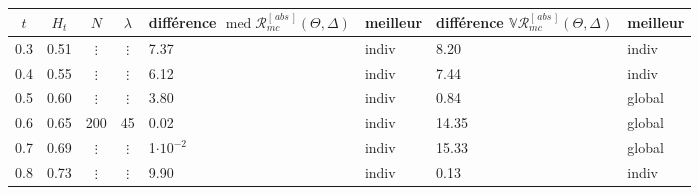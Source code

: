 
\begin{table}[H]
    \begin{tabularx}{\textwidth}{ccccXXXX}
        \toprule
    $t$ & $H_t$ & $N$      & $\lambda$ & différence $\operatorname{med} \mathcal R^{[\,abs\,]}_{mc}(\Theta, \Delta)$ & \textbf{meilleur} & différence  $\mathds V \mathcal R^{[\,abs\,]}_{mc}(\Theta, \Delta)$ & \textbf{meilleur} \\
        \midrule
    
        0.3 & 0.51  & $\vdots$ & $\vdots$  & 7.37                                                       & indiv             & 8.20                                               & indiv             \\
        0.4 & 0.55  & $\vdots$ & $\vdots$  & 6.12                                                       & indiv             & 7.44                                               & indiv             \\
        0.5 & 0.60  & $\vdots$ & $\vdots$  & 3.80                                                       & indiv             & 0.84                                               & global            \\
        0.6 & 0.65  & 200      & 45        & 0.02                                                       & indiv             & 14.35                                              & global            \\
        0.7 & 0.69  & $\vdots$ & $\vdots$  & 1$\cdot 10^{-2}$                                           & indiv             & 15.33                                              & global            \\
        0.8 & 0.73  & $\vdots$ & $\vdots$  & 9.90                                                       & indiv             & 0.13                                               & indiv             \\
    
        \midrule
    

\end{tabularx}
\end{table}
